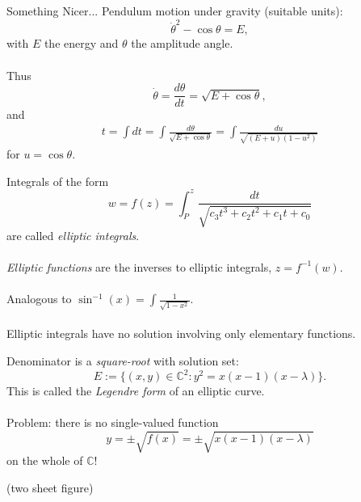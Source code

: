 \documentclass{beamer}
\begin{document}
\begin{frame}[t]{Something Nicer...}
	Pendulum motion under gravity (suitable units):
	\begin{equation*}
	\dot{\theta}^{2} - \cos \theta = E,
	\end{equation*}
	with $E$ the energy and $\theta$ the amplitude angle. \\~\\
	
	Thus
	$$
		\dot{\theta} = \frac{d\theta}{dt} = \sqrt{E + \cos\theta},
	$$
	and
	\begin{equation*}
		\begin{split}
			t = \int dt = \int \frac{d\theta}{\sqrt{E + \cos \theta}} = \int \frac{du}{\sqrt{(E + u)(1 - u^{2})}}
		\end{split}
	\end{equation*}
	for $u = \cos \theta$.
\end{frame}

\begin{frame}
	Integrals of the form
	\begin{equation*}
		w = f(z) = \int_{P}^{z} \frac{dt}{ \sqrt{c_{3}t^{3} + c_{2}t^{2} + c_{1}t + c_{0}} }
	\end{equation*}
	are called \emph{elliptic integrals}. \\~\\
	
	\emph{Elliptic functions} are the inverses to elliptic integrals, $z = f^{-1}(w)$. \\~\\
	
	Analogous to $\sin^{-1}(x) = \int\frac{1}{\sqrt{1 - x^{2}}}$. \\~\\
		
	Elliptic integrals have no solution involving only elementary functions.
\end{frame}

\begin{frame}
	Denominator is a \emph{square-root} with solution set:
	\begin{equation*}
		E := \big\{ (x,y) \in \mathbb{C}^{2} :  y^{2} = x(x-1)(x-\lambda) \big\}.
	\end{equation*}
	This is called the \emph{Legendre form} of an elliptic curve. \\~\\
	
	Problem: there is no single-valued function 
	$$
	y = \pm\sqrt{f(x)} = \pm\sqrt{x(x-1)(x-\lambda)}$$
	on the whole of $\mathbb{C}$!
	
	(two sheet figure)
\end{frame}
	
\end{document}
